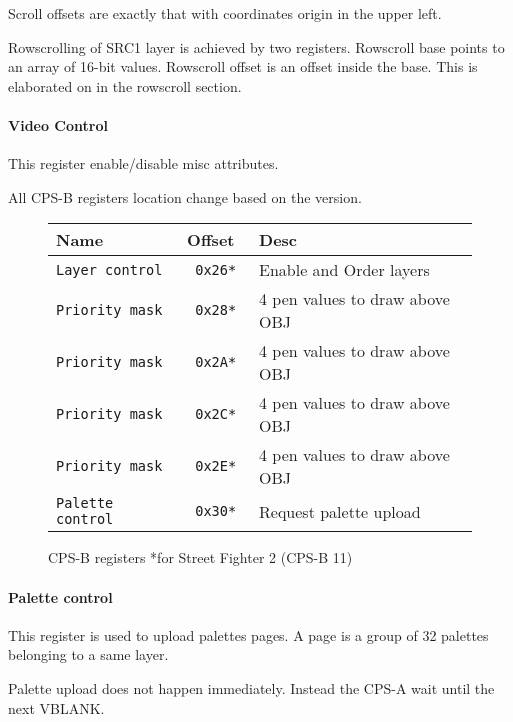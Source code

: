 Scroll offsets are exactly that with coordinates origin in the upper left.

Rowscrolling of SRC1 layer is achieved by two registers. Rowscroll base points to an array of 16-bit values. Rowscroll offset is an offset inside the base. This is elaborated on in the rowscroll section.


\paragraph{Video Control} This register enable/disable misc attributes.

 



All CPS-B registers location change based on the version.

 \begin{figure}[H]
\begin{tabularx}{\textwidth}{llX}
  \toprule    
  \textbf{Name } & \textbf{ Offset }  & \textbf{Desc }\\  
  \toprule   
  \texttt{Layer control} & \texttt{ 0x26* } & Enable and Order layers\\      
\texttt{Priority mask} & \texttt{ 0x28* } &  4 pen values to draw above OBJ   \\  
\texttt{Priority mask} & \texttt{ 0x2A* } &  4 pen values to draw above OBJ   \\  
\texttt{Priority mask} & \texttt{ 0x2C* } &  4 pen values to draw above OBJ   \\  
\texttt{Priority mask} & \texttt{ 0x2E* } &  4 pen values to draw above OBJ  \\  
\texttt{Palette control} & \texttt{ 0x30* } &  Request palette upload\\ 
  \toprule   
\end{tabularx}
\caption*{CPS-B registers *for Street Fighter 2	(CPS-B 11)}
\end{figure}

\paragraph{Palette control}This register is used to upload palettes pages. A page is a group of 32 palettes belonging to a same layer.

 

Palette upload does not happen immediately. Instead the CPS-A wait until the next VBLANK.


